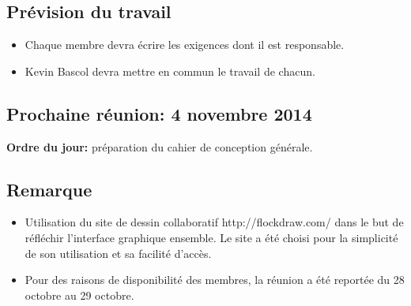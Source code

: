 \documentclass{article}
\begin{document}
\subsection*{Prévision du travail}
	\begin{itemize}
		\item Chaque membre devra écrire les exigences dont il est responsable.
		\item Kevin Bascol devra mettre en commun le travail de chacun.
	\end{itemize}
	
\subsection*{Prochaine réunion: 4 novembre 2014}
	\textbf{Ordre du jour:} préparation du cahier de conception générale.
	
\subsection*{Remarque}
\begin{itemize}
	\item Utilisation du site de dessin collaboratif http://flockdraw.com/ dans le but de réfléchir l'interface graphique ensemble. Le site a été choisi pour la simplicité de son utilisation et sa facilité d'accès.
	\item Pour des raisons de disponibilité des membres, la réunion a été reportée du 28 octobre au 29 octobre.
\end{itemize}

\newpage
\end{document}

